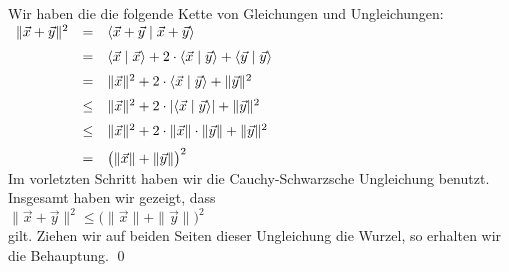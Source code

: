 \proof
Wir haben die die folgende Kette von Gleichungen und Ungleichungen:
\\[0.2cm]
\hspace*{1.3cm}
$
\begin{array}[t]{lcll}
  \|\vec{x} + \vec{y}\|^2 & = & \langle \vec{x} + \vec{y} \mid  \vec{x} + \vec{y} \rangle \\[0.2cm]
                          & = & \langle \vec{x} \mid \vec{x} \rangle + 
                                2 \cdot \langle \vec{x} \mid \vec{y} \rangle + 
                                \langle \vec{y} \mid \vec{y} \rangle \\[0.2cm]
                          & = & \|\vec{x}\|^2 + 2 \cdot \langle \vec{x} \mid \vec{y} \rangle + \|\vec{y}\|^2 \\[0.2cm]
                          & \leq & \|\vec{x}\|^2 + 2 \cdot |\langle \vec{x} \mid \vec{y} \rangle| + \|\vec{y}\|^2 \\[0.2cm]
                          & \leq & \|\vec{x}\|^2 + 2 \cdot \|\vec{x}\| \cdot \|\vec{y}\| + \|\vec{y}\|^2 \\[0.2cm]
                          & = & \bigl(\|\vec{x}\| + \|\vec{y}\|\bigr)^2 
\end{array}
$
\\[0.2cm]
Im vorletzten Schritt haben wir die Cauchy-Schwarzsche Ungleichung benutzt.  Insgesamt haben wir
gezeigt, dass
\\[0.2cm]
\hspace*{1.3cm}
$\|\vec{x} + \vec{y}\|^2 \leq \bigl(\|\vec{x}\| + \|\vec{y}\|\bigr)^2$
\\[0.2cm] 
gilt.  Ziehen wir auf beiden Seiten dieser Ungleichung die Wurzel, so erhalten wir die Behauptung.  
\qed

